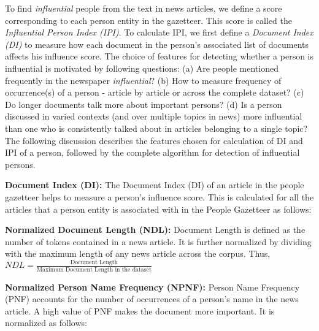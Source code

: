 To find \emph{influential} people from the text in news articles, we define a score corresponding to each person entity in the gazetteer. This score is called the \emph{Influential Person Index (IPI)}. To calculate IPI, we first define a \emph{Document Index (DI)} to measure how each document in the person's associated list of documents affects his influence score. The choice of features for detecting whether a person is influential is motivated by following questions: (a) Are people mentioned frequently in the newspaper \emph{influential}? (b) How to measure frequency of occurrence(s) of a person - article by article or across the complete dataset? (c) Do longer documents talk more about important persons? (d) Is a person discussed in varied contexts (and over multiple topics in news) more influential than one who is consistently talked about in articles belonging to a single topic?  The following discussion describes the features chosen for calculation of DI and IPI of a person, followed by the complete algorithm for detection of influential persons.

\noindent \textbf{Document Index (DI): }
The Document Index (DI) of an article in the people gazetteer helps to measure a person's influence score. This is calculated for all the articles that a person entity is associated with in the People Gazetteer as follows:

\noindent \textbf{Normalized Document Length (NDL): } 
Document Length is defined as the number of tokens contained in a news article. It is further normalized by dividing with the maximum length of any news article across the corpus. Thus,  
$NDL= \frac{\text{Document Length}} {\text{Maximum Document Length in the dataset}}$


\noindent \textbf{ Normalized Person Name Frequency (NPNF): }
Person Name Frequency (PNF) accounts for the number of occurrences of a person's name in the news article. A high value of PNF makes the document more important. It is normalized as follows:

